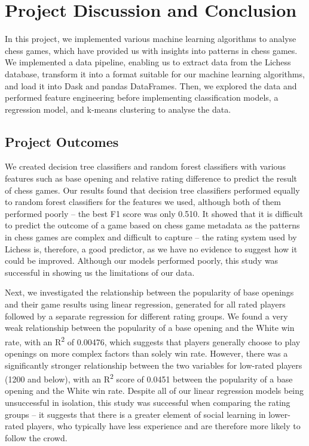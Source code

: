 \documentclass[a4paper, 11pt]{article}
\begin{document}
\section{Project Discussion and Conclusion}
In this project, we implemented various machine learning algorithms to analyse chess games, which have provided us with insights into patterns in chess games. We implemented a data pipeline, enabling us to extract data from the Lichess database, transform it into a format suitable for our machine learning algorithms, and load it into Dask and pandas DataFrames. Then, we explored the data and performed feature engineering before implementing classification models, a regression model, and k-means clustering to analyse the data.

\subsection{Project Outcomes}
We created decision tree classifiers and random forest classifiers with various features such as base opening and relative rating difference to predict the result of chess games. Our results found that decision tree classifiers performed equally to random forest classifiers for the features we used, although both of them performed poorly -- the best F1 score was only 0.510. It showed that it is difficult to predict the outcome of a game based on chess game metadata as the patterns in chess games are complex and difficult to capture -- the rating system used by Lichess is, therefore, a good predictor, as we have no evidence to suggest how it could be improved. Although our models performed poorly, this study was successful in showing us the limitations of our data.

Next, we investigated the relationship between the popularity of base openings and their game results using linear regression, generated for all rated players followed by a separate regression for different rating groups. We found a very weak relationship between the popularity of a base opening and the White win rate, with an R\textsuperscript{2} of 0.00476, which suggests that players generally choose to play openings on more complex factors than solely win rate. However, there was a significantly stronger relationship between the two variables for low-rated players (1200 and below), with an R\textsuperscript{2} score of 0.0451 between the popularity of a base opening and the White win rate. Despite all of our linear regression models being unsuccessful in isolation, this study was successful when comparing the rating groups -- it suggests that there is a greater element of social learning in lower-rated players, who typically have less experience and are therefore more likely to follow the crowd.
\end{document}
